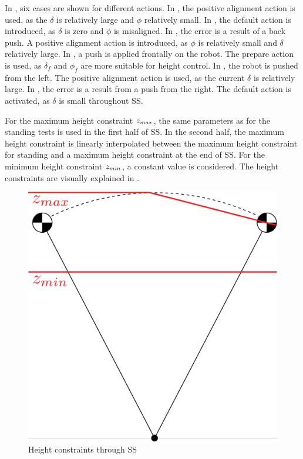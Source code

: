 In , six cases are shown for different actions. In , the positive alignment action is used, as the $\delta$ is relatively large and $\phi$ relatively small. In , the default action is introduced, as $\delta$ is zero and $\phi$ is misaligned. In , the error is a result of a back push. A positive alignment action is introduced, as $\phi$ is relatively small and $\delta$ relatively large. In , a push is applied frontally on the robot. The prepare action is used, as $\delta_f$ and $\phi_f$ are more suitable for height control. In , the robot is pushed from the left. The positive alignment action is used, as the current $\delta$ is relatively large. In , the error is a result from a push from the right. The default action is activated, as $\delta$ is small throughout \ac{SS}.

For the maximum height constraint $z_{max}$, the same parameters as for the standing tests is used in the first half of \ac{SS}. In the second half, the maximum height constraint is linearly interpolated between the maximum height constraint for standing and a maximum height constraint at the end of \ac{SS}.  For the minimum height constraint $z_{min}$, a constant value is considered. The height constraints are visually explained in .
\begin{figure}
\centering
  \includegraphics[width=.4\linewidth]{STYLESTUFF/heightconstraints.png}
   \caption{Height constraints through \acf{SS}}
    \label{fig:heightconstraints}
\end{figure} 
